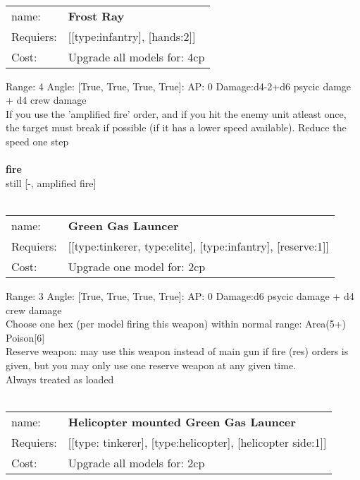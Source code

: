 \ \\
\begin{tabular}{ll}
name: & {\bf Frost Ray } \\
Requiers: & [[type:infantry], [hands:2]] \\
Cost: & Upgrade all models for: 4cp \\
\end{tabular}



Range: 4  Angle: [True, True, True, True]: AP: 0 Damage:d4-2+d6 psycic damge + d4 crew damage \\
If you use the 'amplified fire' order, and if you hit the enemy unit atleast once, the target must break if possible (if it has a lower speed available). Reduce the speed one step\\ 







\ \\ {\bf fire } \\
still [-, amplified fire] \\

\ \\
\begin{tabular}{ll}
name: & {\bf Green Gas Launcer } \\
Requiers: & [[type:tinkerer, type:elite], [type:infantry], [reserve:1]] \\
Cost: & Upgrade one model for: 2cp \\
\end{tabular}



Range: 3  Angle: [True, True, True, True]: AP: 0 Damage:d6 psycic damage + d4 crew damage \\
Choose one hex (per model firing this weapon) within normal range: Area(5+)\\ 
Poison[6]\\ 
Reserve weapon: may use this weapon instead of main gun if fire (res) orders is given, but you may only use one reserve weapon at any given time.\\ 
Always treated as loaded\\ 








\ \\
\begin{tabular}{ll}
name: & {\bf Helicopter mounted Green Gas Launcer } \\
Requiers: & [[type: tinkerer], [type:helicopter], [helicopter side:1]] \\
Cost: & Upgrade all models for: 2cp \\
\end{tabular}



